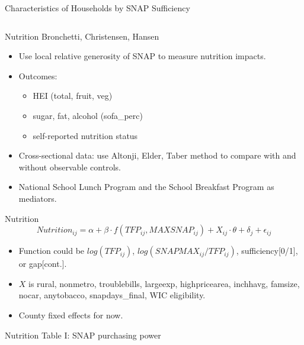 \documentclass{beamer}
\begin{document}
\begin{frame}
\begin{table}{Characteristics of Households by SNAP Sufficiency}
\begin{adjustbox}{max width=\textwidth}
\begin{tabular}{lllllll}
    
    \bottomrule
\end{tabular}
\end{adjustbox}
\end{table}
\end{frame}



\begin{frame}{Nutrition}
 Bronchetti, Christensen, Hansen
\begin{itemize}
\item Use local relative generosity of SNAP to measure nutrition impacts.
\item Outcomes: 
\begin{itemize}
\item HEI (total, fruit, veg)
\item sugar, fat, alcohol (sofa\_perc)
\item self-reported nutrition status
\end{itemize}
\item Cross-sectional data: use Altonji, Elder, Taber method to compare with and without observable controls.
\item National School Lunch Program and the School Breakfast Program as mediators.
\end{itemize}

\end{frame}


\begin{frame}{Nutrition}
 $$Nutrition_{ij}=\alpha + \beta \cdot f(TFP_{ij}, MAXSNAP_{ij}) + X_{ij} \cdot \theta + \delta_{j}+\epsilon_{ij} $$
 
\begin{itemize}
\item Function could be $log (TFP_{ij})$, $log(SNAPMAX_{ij}/TFP_{ij})$, sufficiency[0/1], or gap[cont.].
\item $X$ is rural, nonmetro, troublebills, largeexp, highpricearea, inchhavg, famsize, nocar, anytobacco, snapdays\_final, WIC eligibility.
\item County fixed effects for now.
\end{itemize}
\end{frame}


\begin{frame}{Nutrition}
Table I: SNAP purchasing power
\end{frame}
\end{document}
